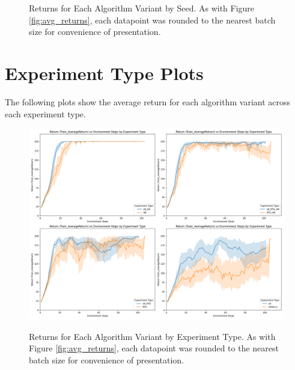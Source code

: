 \documentclass{article} %
\begin{document}
\begin{figure}[p]
    \label{fig:returns_by_seed}
    \caption{Returns for Each Algorithm Variant by Seed. As with Figure \ref{fig:avg_returns},
    each datapoint was rounded to the nearest batch size for convenience of presentation.}
\end{figure}

\newpage

\section{Experiment Type Plots} \label{sec:experiment_type_plots}
The following plots show the average return for each algorithm variant across each experiment type.
\begin{figure}[h]
    \centering
    \captionsetup{justification=centering}
    \includegraphics[width = \linewidth, height = 0.4\textheight]{plots/return-vs-env-steps-all-expt-types.png}
    \label{fig:returns_by_experiment_type}
    \caption{Returns for Each Algorithm Variant by Experiment Type. As with Figure \ref{fig:avg_returns},
    each datapoint was rounded to the nearest batch size for convenience of presentation.}
\end{figure}
\end{document}
